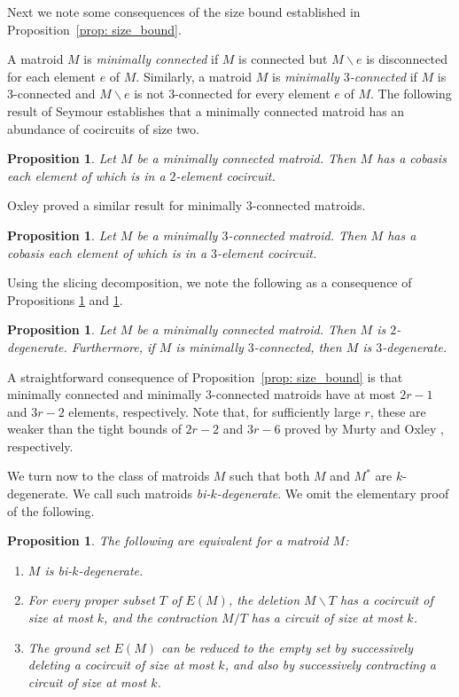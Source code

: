 \documentclass{amsart}
\newcommand{\ba}{\backslash}
\newtheorem{proposition}[theorem]{Proposition}
\theoremstyle{definition}
\theoremstyle{remark}
\numberwithin{equation}{section}
\begin{document}
Next we note some consequences of the size bound established in Proposition~\ref{prop: size_bound}. 

A matroid $M$ is \textit{minimally connected} if $M$ is connected but $M \ba e$ is disconnected for each element $e$ of $M$. Similarly, a matroid $M$ is \textit{minimally $3$-connected} if $M$ is $3$-connected and $M \ba e$ is not $3$-connected for every element $e$ of $M$. The following result of Seymour \cite{seymour} establishes that a minimally connected matroid has an abundance of cocircuits of size two. 

\begin{proposition}
\label{seymour_2-cocircuits}
Let $M$ be a minimally connected matroid. Then $M$ has a cobasis each element of which is in a $2$-element cocircuit. 
\end{proposition}

Oxley \cite{Oxl81} proved a similar result for minimally $3$-connected matroids. 

\begin{proposition}
\label{triads}
Let $M$ be a minimally $3$-connected matroid. Then $M$ has a cobasis each element of which is in a $3$-element cocircuit. 
\end{proposition}

Using the slicing decomposition, we note the following as a consequence of Propositions \ref{seymour_2-cocircuits} and \ref{triads}.  

\begin{proposition}
\label{minimal_connected_degenerate}
Let $M$ be a minimally connected matroid. Then $M$ is $2$-degenerate. Furthermore, if $M$ is minimally $3$-connected, then $M$ is $3$-degenerate. 
\end{proposition}

A straightforward consequence of Proposition~\ref{prop: size_bound} is that minimally connected and minimally $3$-connected matroids have at most $2r-1$ and $3r-2$ elements, respectively. Note that, for sufficiently large $r$, these are weaker than the tight bounds of $2r-2$ and $3r-6$ proved by Murty \cite{murty_74} and Oxley \cite{Oxl81}, respectively. 

We turn now to the class of matroids $M$ such that both $M$ and $M^*$ are $k$-degenerate. We call such matroids \textit{bi-$k$-degenerate}. We omit the elementary proof of the following.

\begin{proposition}
\label{prop: bi-k-degen-char}
The following are equivalent for a matroid $M$:
\begin{enumerate}[label=(\roman*)]
    \item $M$ is bi-$k$-degenerate.
    \item For every proper subset $T$ of $E(M)$, the deletion $M \ba T$ has a cocircuit of size at most $k$, and the contraction $M / T$ has a circuit of size at most $k$. 
    \item The ground set $E(M)$ can be reduced to the empty set by successively deleting a cocircuit of size at most $k$, and also by successively contracting a circuit of size at most $k$. 
\end{enumerate}
\end{proposition}
\end{document}
